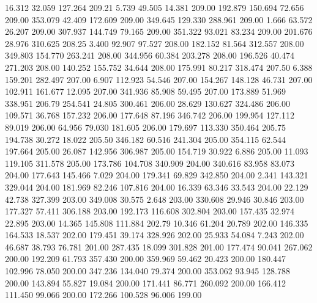  16.312   32.059  127.264       209.21
   5.739   49.505   14.381       209.00
 192.879  150.694   72.656       209.00
 353.079   42.409  172.609       209.00
 349.645  129.330  288.961       209.00
   1.666   63.572   26.207       209.00
 307.937  144.749   79.165       209.00
 351.322   93.021   83.234       209.00
 201.676   28.976  310.625       208.25
   3.400   92.907   97.527       208.00
 182.152   81.564  312.557       208.00
 349.803  154.770  263.241       208.00
 344.956   60.384  203.278       208.00
 196.526   40.474  271.203       208.00
 140.252  155.752   34.644       208.00
 175.991   80.217  318.474       207.50
   6.388  159.201  282.497       207.00
   6.907  112.923   54.546       207.00
 154.267  148.128   46.731       207.00
 102.911  161.677   12.095       207.00
 341.936   85.908   59.495       207.00
 173.889   51.969  338.951       206.79
 254.541   24.805  300.461       206.00
  28.629  130.627  324.486       206.00
 109.571   36.768  157.232       206.00
 177.648   87.196  346.742       206.00
 199.954  127.112   89.019       206.00
  64.956   79.030  181.605       206.00
 179.697  113.330  350.464       205.75
 194.738   30.272   18.022       205.50
 346.182   60.516  241.304       205.00
 354.115   62.544  197.664       205.00
  26.087  142.956  306.987       205.00
 154.719   30.922    6.886       205.00
  11.093  119.105  311.578       205.00
 173.786  104.708  340.909       204.00
 340.616   83.958   83.073       204.00
 177.643  145.466    7.029       204.00
 179.341   69.829  342.850       204.00
   2.341  143.321  329.044       204.00
 181.969   82.246  107.816       204.00
  16.339   63.346   33.543       204.00
  22.129   42.738  327.399       203.00
 349.008   30.575    2.648       203.00
 330.608   29.946   30.846       203.00
 177.327   57.411  306.188       203.00
 192.173  116.608  302.804       203.00
 157.435   32.974   22.895       203.00
  14.365  145.808  111.884       202.79
  10.346   61.204   20.789       202.00
 146.335  164.533   18.537       202.00
 179.451   39.174  328.926       202.00
  25.933   54.084    7.243       202.00
  46.687   38.793   76.781       201.00
 287.435   18.099  301.828       201.00
 177.474   90.041  267.062       200.00
 192.209   61.793  357.430       200.00
 359.969   59.462   20.423       200.00
 180.447  102.996   78.050       200.00
 347.236  134.040   79.374       200.00
 353.062   93.945  128.788       200.00
 143.894   55.827   19.084       200.00
 171.441   86.771  260.092       200.00
 166.412  111.450   99.066       200.00
 172.266  100.528   96.006       199.00
